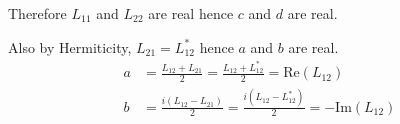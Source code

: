 \documentclass[12pt]{article}
\begin{document}
Therefore $L_{11}$ and $L_{22}$ are real hence $c$ and $d$ are real.

\bigskip
Also by Hermiticity, $L_{21}=L_{12}^*$ hence $a$ and $b$ are real.
\begin{align*}
a&=\frac{L_{12}+L_{21}}{2}=\frac{L_{12}+L_{12}^*}{2}=\text{Re}(L_{12})
\\
b&=\frac{i(L_{12}-L_{21})}{2}=\frac{i(L_{12}-L_{12}^*)}{2}=-\text{Im}(L_{12})
\end{align*}
\end{document}
